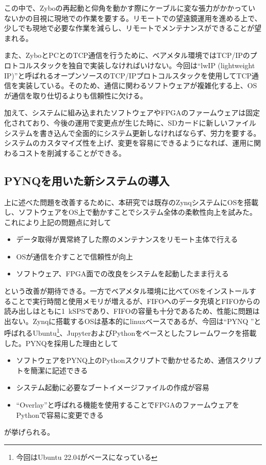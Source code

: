 この中で、Zyboの再起動と仰角を動かす際にケーブルに変な張力がかかっていないかの目視に現地での作業を要する。リモートでの望遠鏡運用を進める上で、少しでも現地で必要な作業を減らし、リモートでメンテナンスができることが望まれる。

また、ZyboとPCとのTCP通信を行うために、ベアメタル環境ではTCP/IPのプロトコルスタックを独自で実装しなければいけない。今回は``lwIP (lightweight IP)''と呼ばれるオープンソースのTCP/IPプロトコルスタックを使用してTCP通信を実装している。そのため、通信に関わるソフトウェアが複雑化する上、OSが通信を取り仕切るよりも信頼性に欠ける。

加えて、システムに組み込まれたソフトウェアやFPGAのファームウェアは固定化されており、今後の運用で変更点が生じた時に、SDカードに新しいファイルシステムを書き込んで全面的にシステム更新しなければならず、労力を要する。システムのカスタマイズ性を上げ、変更を容易にできるようになれば、運用に関わるコストを削減することができる。

\subsection{PYNQを用いた新システムの導入}
上に述べた問題を改善するために、本研究では既存のZynqシステムにOSを搭載し、ソフトウェアをOS上で動かすことでシステム全体の柔軟性向上を試みた。これにより上記の問題点に対して
\begin{itemize}
  \item データ取得が異常終了した際のメンテナンスをリモート主体で行える
  \item OSが通信を介すことで信頼性が向上
  \item ソフトウェア、FPGA面での改良をシステムを起動したまま行える
\end{itemize}
という改善が期待できる。一方でベアメタル環境に比べてOSをインストールすることで実行時間と使用メモリが増えるが、FIFOへのデータ充填とFIFOからの読み出しはともに\SI{1}{kSPS}であり、FIFOの容量も十分であるため、性能に問題は出ない。Zynqに搭載するOSは基本的にlinuxベースであるが、今回は``PYNQ \cite{Pynq}''と呼ばれるUbuntu\footnote{今回はUbuntu 22.04がベースになっている}、JupyterおよびPythonをベースとしたフレームワークを搭載した。PYNQを採用した理由として
\begin{itemize}
  \item ソフトウェアをPYNQ上のPythonスクリプトで動かせるため、通信スクリプトを簡潔に記述できる
  \item システム起動に必要なブートイメージファイルの作成が容易
  \item ``Overlay''と呼ばれる機能を使用することでFPGAのファームウェアをPythonで容易に変更できる
\end{itemize}
が挙げられる。

